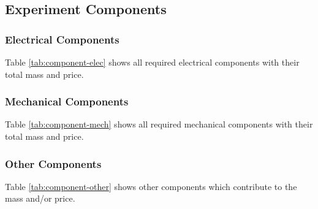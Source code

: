 \begin{landscape}
\subsection{Experiment Components} \label{components}
\label{sec:experiment-components}

\subsubsection{Electrical Components}
Table \ref{tab:component-elec} shows all required electrical components with their total mass and price.\\


\end{landscape}

\begin{landscape}

\subsubsection{Mechanical Components}
Table \ref{tab:component-mech} shows all required mechanical components with their total mass and price.\\


\raggedbottom
\end{landscape}

\begin{landscape}
\subsubsection{Other Components}
Table \ref{tab:component-other} shows other components which contribute to the mass and/or price.\\



\raggedbottom
\end{landscape}